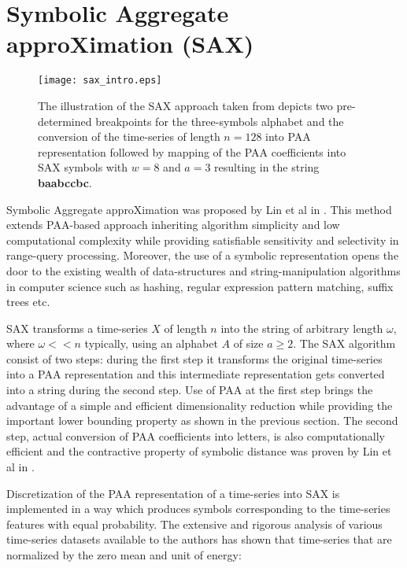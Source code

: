 \section{Symbolic Aggregate approXimation (SAX)} \label{sax}
\begin{figure}[tbp]
   \centering
   \texttt{[image: sax\_intro.eps]}
   \caption{The illustration of the SAX approach taken from \cite{citeulike:2821475} depicts two pre-determined breakpoints for the three-symbols alphabet and the conversion of the time-series of length $n=128$ into PAA representation followed by mapping of the PAA coefficients into SAX symbols with $w=8$ and $a=3$ resulting in the string \textbf{baabccbc}.}
   \label{fig:sax_intro}
\end{figure}

Symbolic Aggregate approXimation was proposed by Lin et al in \cite{citeulike:2821475}. This method extends PAA-based approach inheriting algorithm simplicity and low computational complexity while providing satisfiable sensitivity and selectivity in range-query processing. Moreover, the use of a symbolic representation opens the door to the existing wealth of data-structures and string-manipulation algorithms in computer science such as hashing, regular expression pattern matching, suffix trees etc.

SAX transforms a time-series $X$ of length $n$ into the string of arbitrary length $\omega$, where $\omega << n$ typically, using an alphabet $A$ of size $ a \geq 2$. The SAX algorithm consist of two steps: during the first step it transforms the original time-series into a PAA representation and this intermediate representation gets converted into a string during the second step. Use of PAA at the first step brings the advantage of a simple and efficient dimensionality reduction while providing the important lower bounding property as shown in the previous section. The second step, actual conversion of PAA coefficients into letters, is also computationally efficient and the contractive property of symbolic distance was proven by Lin et al in \cite{citeulike:532335}.

Discretization of the PAA representation of a time-series into SAX is implemented in a way which produces symbols corresponding to the time-series features with equal probability. The extensive and rigorous analysis of various time-series datasets available to the authors has shown that time-series that are normalized by the zero mean and unit of energy: 



